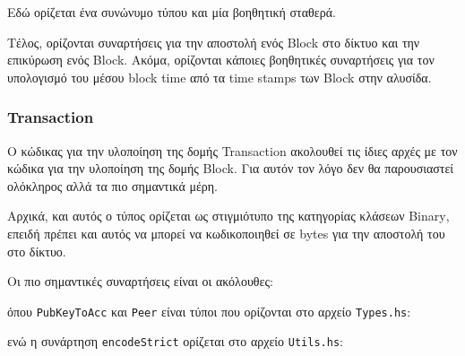 \documentclass{article}
\newcommand{\eng}[1]{\foreignlanguage{english}{#1}} %
\begin{document}
Εδώ ορίζεται ένα συνώνυμο τύπου και μία βοηθητική σταθερά.

    

Τέλος, ορίζονται συναρτήσεις για την αποστολή ενός \eng{Block} στο δίκτυο και την
επικύρωση ενός \eng{Block}. Ακόμα, ορίζονται κάποιες βοηθητικές συναρτήσεις για τον
υπολογισμό του μέσου \eng{block time} από τα \eng{time stamps} των \eng{Block} στην
αλυσίδα.
    
\FloatBarrier

\subsubsection{\eng{Transaction}}

Ο κώδικας για την υλοποίηση της δομής \eng{Transaction} ακολουθεί τις ίδιες αρχές με
τον κώδικα για την υλοποίηση της δομής \eng{Block}. Για αυτόν τον λόγο δεν θα παρουσιαστεί
ολόκληρος αλλά τα πιο σημαντικά μέρη.

Αρχικά, και αυτός ο τύπος ορίζεται ως στιγμιότυπο της κατηγορίας κλάσεων \eng{Binary}, επειδή
πρέπει και αυτός να μπορεί να κωδικοποιηθεί σε \eng{bytes} για την αποστολή του στο δίκτυο.

Οι πιο σημαντικές συναρτήσεις είναι οι ακόλουθες:

\begin{figure}[ht]
    
\end{figure}
\FloatBarrier

όπου \texttt{\eng{PubKeyToAcc}} και \texttt{\eng{Peer}} είναι τύποι που ορίζονται στο
αρχείο \texttt{\eng{Types.hs}}:

\begin{figure}[ht]
    
\end{figure}
\FloatBarrier

ενώ η συνάρτηση \texttt{\eng{encodeStrict}} ορίζεται στο αρχείο \texttt{\eng{Utils.hs}}:
\end{document}
